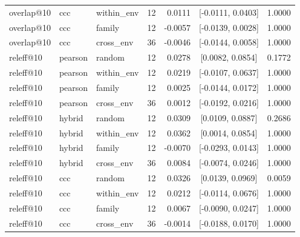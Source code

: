\begin{longtable}{lllrrcc}
overlap@10 & ccc & within\_env & 12 & 0.0111 & [-0.0111, 0.0403] & 1.0000 \\
overlap@10 & ccc & family & 12 & -0.0057 & [-0.0139, 0.0028] & 1.0000 \\
overlap@10 & ccc & cross\_env & 36 & -0.0046 & [-0.0144, 0.0058] & 1.0000 \\
releff@10 & pearson & random & 12 & 0.0278 & [0.0082, 0.0854] & 0.1772 \\
releff@10 & pearson & within\_env & 12 & 0.0219 & [-0.0107, 0.0637] & 1.0000 \\
releff@10 & pearson & family & 12 & 0.0025 & [-0.0144, 0.0172] & 1.0000 \\
releff@10 & pearson & cross\_env & 36 & 0.0012 & [-0.0192, 0.0216] & 1.0000 \\
releff@10 & hybrid & random & 12 & 0.0309 & [0.0109, 0.0887] & 0.2686 \\
releff@10 & hybrid & within\_env & 12 & 0.0362 & [0.0014, 0.0854] & 1.0000 \\
releff@10 & hybrid & family & 12 & -0.0070 & [-0.0293, 0.0143] & 1.0000 \\
releff@10 & hybrid & cross\_env & 36 & 0.0084 & [-0.0074, 0.0246] & 1.0000 \\
releff@10 & ccc & random & 12 & 0.0326 & [0.0139, 0.0969] & 0.0059 \\
releff@10 & ccc & within\_env & 12 & 0.0212 & [-0.0114, 0.0676] & 1.0000 \\
releff@10 & ccc & family & 12 & 0.0067 & [-0.0090, 0.0247] & 1.0000 \\
releff@10 & ccc & cross\_env & 36 & -0.0014 & [-0.0188, 0.0170] & 1.0000 \\
\end{longtable}


